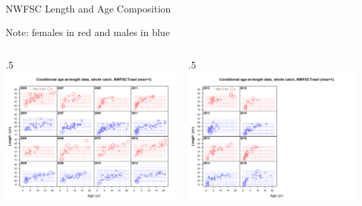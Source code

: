 \documentclass[ignorenonframetext,]{beamer}
\def\begincols{\begin{columns}}
\def\begincol{\begin{column}}
\def\endcol{\end{column}}
\def\endcols{\end{columns}}
\begin{document}
\begin{frame}{NWFSC Length and Age Composition}

Note: females in red and males in blue \begincols
 \begincol{.5\textwidth}
\includegraphics[height=.5\textheight]{r4ss/plots_mod1/comp_condAALdat_bubflt8mkt0_page1.png}
\endcol
 \begincol{.5\textwidth}
\includegraphics[height=.5\textheight]{r4ss/plots_mod1/comp_condAALdat_bubflt8mkt0_page2.png}
\endcol
\endcols

\end{frame}
\end{document}
